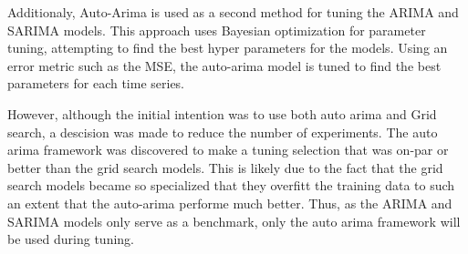 Additionaly, Auto-Arima is used as a second method for tuning the ARIMA and SARIMA models.
This approach uses Bayesian optimization for parameter tuning, attempting to find the best hyper parameters for the models.
Using an error metric such as the MSE, the auto-arima model is tuned to find the best parameters for each time series.

However, although the initial intention was to use both auto arima and Grid search, a descision was made to reduce the number of experiments.
The auto arima framework was discovered to make a tuning selection that was on-par or better than the grid search models.
This is likely due to the fact that the grid search models became so specialized that they overfitt the training data to such an extent that the auto-arima performe much better.
Thus, as the ARIMA and SARIMA models only serve as a benchmark, only the auto arima framework will be used during tuning.
